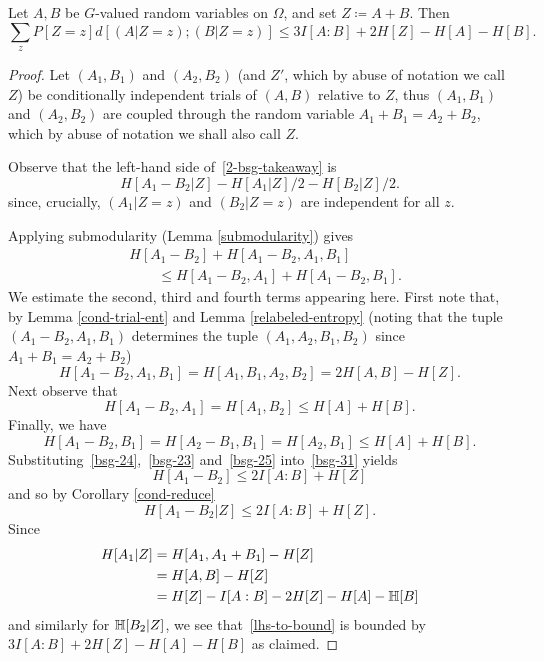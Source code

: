 \begin{lemma}\label{lem-bsg}
  Let $A,B$ be $G$-valued random variables on $\Omega$, and set $Z \coloneq A+B$.
Then
\begin{equation}\label{2-bsg-takeaway} \sum_{z} P[Z=z] d[(A | Z = z); (B | Z = z)] \leq 3 I[A:B] + 2 H[Z] - H[A] - H[B]. \end{equation}
\end{lemma}

\begin{proof}
Let $(A_1, B_1)$ and $(A_2, B_2)$ (and $Z'$, which by abuse of notation we call $Z$) be conditionally independent trials of $(A,B)$ relative to $Z$, thus $(A_1,B_1)$ and $(A_2,B_2)$ are coupled through the random variable $A_1 + B_1 = A_2 + B_2$, which by abuse of notation we shall also call $Z$.

Observe that the left-hand side of~\eqref{2-bsg-takeaway} is
\begin{equation}\label{lhs-to-bound}
H[A_1 - B_2| Z] - H[A_1 | Z]/2 - H[B_2 | Z]/2.
\end{equation}
since, crucially, $(A_1 | Z=z)$ and $(B_2 | Z=z)$ are independent for all $z$.

Applying submodularity (Lemma \ref{submodularity}) gives
\begin{equation}\label{bsg-31} \begin{split}
&H[A_1 - B_2] + H[A_1 - B_2, A_1, B_1] \\
&\qquad \leq H[A_1 - B_2, A_1] + H[A_1 - B_2,B_1].
\end{split}\end{equation}
We estimate the second, third and fourth terms appearing here.
First note that, by Lemma \ref{cond-trial-ent} and Lemma \ref{relabeled-entropy} (noting that the tuple $(A_1 - B_2, A_1, B_1)$  determines the tuple $(A_1, A_2, B_1, B_2)$ since $A_1+B_1=A_2+B_2$)
\begin{equation}\label{bsg-24} H[A_1 - B_2, A_1, B_1] = H[A_1, B_1, A_2, B_2] = 2H[A,B] - H[Z].\end{equation}
Next observe that
\begin{equation}\label{bsg-23} H[A_1 - B_2, A_1] = H[A_1, B_2] \leq H[A] + H[B].
\end{equation}
Finally, we have
\begin{equation}\label{bsg-25} H[A_1 - B_2, B_1] = H[A_2 - B_1, B_1] = H[A_2, B_1] \leq H[A] + H[B].\end{equation}
Substituting~\eqref{bsg-24},~\eqref{bsg-23} and~\eqref{bsg-25} into~\eqref{bsg-31} yields
\[ H[A_1 - B_2] \leq 2I[A:B] + H[Z]\] and so by Corollary \ref{cond-reduce}
\[H[A_1 - B_2 | Z]  \leq 2I[A:B] + H[Z].\]
Since
\begin{align*} H[A_1 | Z] & = H[A_1, A_1 + B_1] - H[Z] \\ & = H[A,B] - H[Z] \\ & = H[Z] - I[A:B] - 2 H[Z]-H[A]-\mathbb{H}[B]\end{align*}
and similarly for $\mathbb{H}[B_2 | Z]$, we see that~\eqref{lhs-to-bound} is bounded by
$3I[A:B] + 2H[Z]-H[A]-H[B]$ as claimed.
\end{proof}
